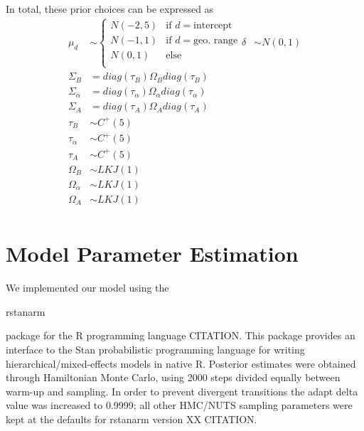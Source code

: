 \documentclass[12pt,letterpaper]{article}
\begin{document}
In total, these prior choices can be expressed as
\begin{equation}
  \begin{aligned}
    \mu_{d} &\sim 
      \begin{cases}
        N(-2, 5) & \text{if } d = \text{intercept} \\
        N(-1, 1) & \text{if } d = \text{geo. range} \\
        N(0, 1) & \text{else } \\
      \end{cases}
    \delta &\sim N(0, 1) \\
    \Sigma_{B} &= diag(\tau_{B}) \Omega_{B} diag(\tau_{B}) \\
    \Sigma_{\alpha} &= diag(\tau_{\alpha}) \Omega_{\alpha} diag(\tau_{\alpha}) \\
    \Sigma_{A} &= diag(\tau_{A}) \Omega_{A} diag(\tau_{A}) \\
    \tau_{B} &\sim C^{+}(5) \\
    \tau_{\alpha} &\sim C^{+}(5) \\
    \tau_{A} &\sim C^{+}(5) \\
    \Omega_{B} &\sim LKJ(1) \\
    \Omega_{\alpha} &\sim LKJ(1) \\
    \Omega_{A} &\sim LKJ(1) \\
  \end{aligned}
  \label{eq:priors}
\end{equation}


\section{Model Parameter Estimation}

We implemented our model using the \begin{texttt}rstanarm\end{texttt} package for the R programming language CITATION. This package provides an interface to the Stan probabilistic programming language for writing hierarchical/mixed-effects models in native R. Posterior estimates were obtained through Hamiltonian Monte Carlo, using 2000 steps divided equally between warm-up and sampling. In order to prevent divergent transitions the adapt delta value was increased to 0.9999; all other HMC/NUTS sampling parameters were kept at the defaults for rstanarm version XX CITATION. 
\end{document}
